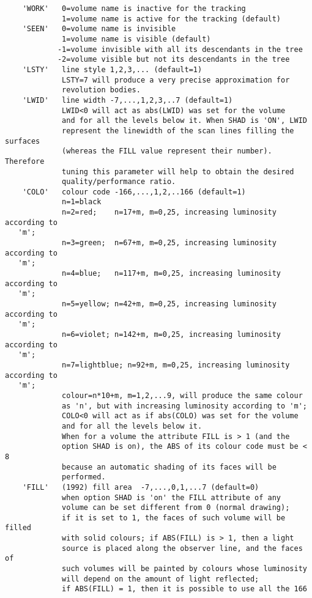 \begin{verbatim}
    'WORK'   0=volume name is inactive for the tracking
             1=volume name is active for the tracking (default)
    'SEEN'   0=volume name is invisible
             1=volume name is visible (default)
            -1=volume invisible with all its descendants in the tree
            -2=volume visible but not its descendants in the tree
    'LSTY'   line style 1,2,3,... (default=1)
             LSTY=7 will produce a very precise approximation for
             revolution bodies.
    'LWID'   line width -7,...,1,2,3,..7 (default=1)
             LWID<0 will act as abs(LWID) was set for the volume
             and for all the levels below it. When SHAD is 'ON', LWID
             represent the linewidth of the scan lines filling the surfaces
             (whereas the FILL value represent their number). Therefore
             tuning this parameter will help to obtain the desired
             quality/performance ratio.
    'COLO'   colour code -166,...,1,2,..166 (default=1)
             n=1=black
             n=2=red;    n=17+m, m=0,25, increasing luminosity according to 
   'm';
             n=3=green;  n=67+m, m=0,25, increasing luminosity according to 
   'm';
             n=4=blue;   n=117+m, m=0,25, increasing luminosity according to 
   'm';
             n=5=yellow; n=42+m, m=0,25, increasing luminosity according to 
   'm';
             n=6=violet; n=142+m, m=0,25, increasing luminosity according to 
   'm';
             n=7=lightblue; n=92+m, m=0,25, increasing luminosity according to 
   'm';
             colour=n*10+m, m=1,2,...9, will produce the same colour
             as 'n', but with increasing luminosity according to 'm';
             COLO<0 will act as if abs(COLO) was set for the volume
             and for all the levels below it.
             When for a volume the attribute FILL is > 1 (and the
             option SHAD is on), the ABS of its colour code must be < 8
             because an automatic shading of its faces will be
             performed.
    'FILL'   (1992) fill area  -7,...,0,1,...7 (default=0)
             when option SHAD is 'on' the FILL attribute of any
             volume can be set different from 0 (normal drawing);
             if it is set to 1, the faces of such volume will be filled
             with solid colours; if ABS(FILL) is > 1, then a light
             source is placed along the observer line, and the faces of
             such volumes will be painted by colours whose luminosity
             will depend on the amount of light reflected;
             if ABS(FILL) = 1, then it is possible to use all the 166

\end{verbatim}
